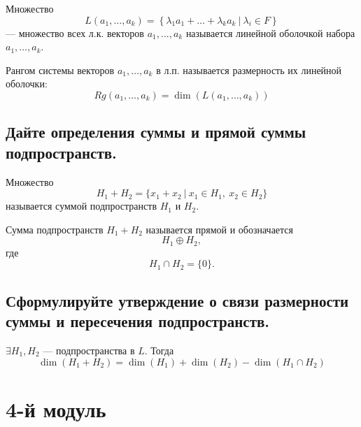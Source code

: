 \begin{definition}
    Множество
    \[
        L(a_1, \ldots, a_k) =
        \left\{
            \lambda_1 a_1 + \ldots + \lambda_k a_k\ |\ \lambda_i \in F
        \right\}
    \]
    --- множество всех л.к. векторов $a_1, \ldots, a_k$ называется линейной оболочкой набора $a_1, \ldots, a_k$.
\end{definition}

\begin{definition}
    Рангом системы векторов $a_1, \ldots, a_k$ в л.п. называется размерность их линейной оболочки:
    \[
        Rg(a_1, \ldots, a_k) = \dim(L(a_1, \ldots, a_k))
    \]
\end{definition}


\subsection{Дайте определения суммы и прямой суммы подпространств.}

\begin{definition}
    Множество
    \[
        H_1 + H_2 =
        \{x_1 + x_2\ |\ x_1 \in H_1,\ x_2 \in H_2\}
    \]
    называется суммой подпространств $H_1$ и $H_2$.
\end{definition}

\begin{definition}
    Сумма подпространств $H_1 + H_2$ называется прямой и обозначается
    \[
        H_1 \oplus H_2,
    \]
    где
    \[
        H_1 \cap H_2 = \{0\}.
    \]
\end{definition}


\subsection{Сформулируйте утверждение о связи размерности суммы и пересечения подпространств.}

\begin{theorem}
    $\exists H_1, H_2$ --- подпространства в $L$. Тогда
    \[
        \dim(H_1 + H_2) =
        \dim(H_1) + \dim(H_2) - \dim(H_1 \cap H_2)
    \]
\end{theorem}

\newpage





\section{4-й модуль}

